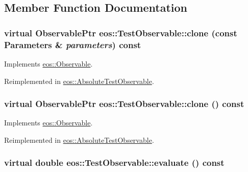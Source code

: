 \subsection{Member Function Documentation}
\hypertarget{structeos_1_1TestObservable_a40b0831f486d5a73e583becb0c6c9da4}{
\subsubsection[{clone}]{\setlength{\rightskip}{0pt plus 5cm}virtual {\bf ObservablePtr} eos::TestObservable::clone (const {\bf Parameters} \& {\em parameters}) const}}
\label{structeos_1_1TestObservable_a40b0831f486d5a73e583becb0c6c9da4}


Implements \hyperlink{classeos_1_1Observable_a20e8218d04aa5589ce795ddd425751a0}{eos::Observable}.

Reimplemented in \hyperlink{structeos_1_1AbsoluteTestObservable_af0a14d774c083598130b3062f956c4c9}{eos::AbsoluteTestObservable}.\hypertarget{structeos_1_1TestObservable_a2ec70cb32b39215b3c3eafd05a94e1f6}{
\subsubsection[{clone}]{\setlength{\rightskip}{0pt plus 5cm}virtual {\bf ObservablePtr} eos::TestObservable::clone () const}}
\label{structeos_1_1TestObservable_a2ec70cb32b39215b3c3eafd05a94e1f6}


Implements \hyperlink{classeos_1_1Observable_a1c88c66a224a14fbddad70e95cb61136}{eos::Observable}.

Reimplemented in \hyperlink{structeos_1_1AbsoluteTestObservable_ac509cca6dca7383653b2d0e5c387db07}{eos::AbsoluteTestObservable}.\hypertarget{structeos_1_1TestObservable_a05f143463bc9a2cddec1ee2bdb8d5ba2}{
\subsubsection[{evaluate}]{\setlength{\rightskip}{0pt plus 5cm}virtual double eos::TestObservable::evaluate () const}}
\label{structeos_1_1TestObservable_a05f143463bc9a2cddec1ee2bdb8d5ba2}


